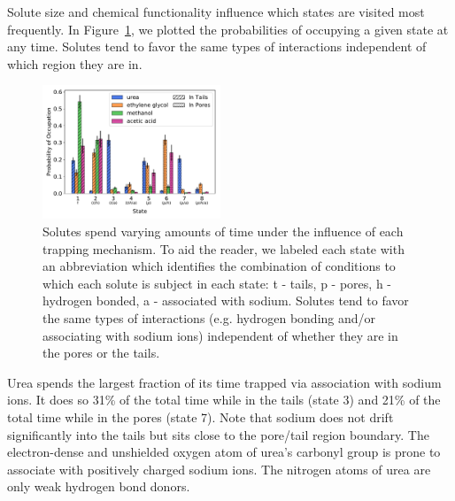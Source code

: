 \documentclass[12pt]{article}
\begin{document}
  Solute size and chemical functionality influence which states are visited most frequently.
  In Figure~\ref{fig:state_probabilities}, we plotted the probabilities of occupying
  a given state at any time. Solutes tend to favor the same types of interactions 
  independent of which region they are in.

  
  \begin{figure}
  \centering
  \includegraphics[width=0.475\textwidth]{state_probabilities.pdf}
  \caption{Solutes spend varying amounts of time under the influence of each
  trapping mechanism. To aid the reader, we labeled each state with an abbreviation which
  identifies the combination of conditions to which each solute is subject in each state:
  t - tails, p - pores, h - hydrogen bonded, a - associated with sodium. Solutes tend to 
  favor the same types of interactions (e.g. hydrogen bonding and/or associating with sodium
  ions) independent of whether they are in the pores or the tails.}\label{fig:state_probabilities}
  \end{figure}
  
  Urea spends the largest fraction of its time trapped via association with sodium ions.
  It does so 31\% of the total time while in the tails (state 3) and 21\% of the
  total time while in the pores (state 7). Note that sodium does not drift significantly 
  into the tails but sits close to the pore/tail region boundary. The electron-dense 
  and unshielded oxygen atom of urea's carbonyl group is prone to associate with 
  positively charged sodium ions. The nitrogen atoms of urea are only weak hydrogen bond
  donors.
  
\end{document}
